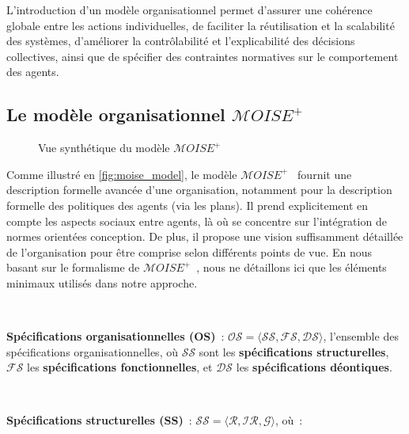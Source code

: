 L’introduction d’un modèle organisationnel permet d’assurer une cohérence globale entre les actions individuelles, de faciliter la réutilisation et la scalabilité des systèmes, d’améliorer la contrôlabilité et l’explicabilité des décisions collectives, ainsi que de spécifier des contraintes normatives sur le comportement des agents.

\subsection{Le modèle organisationnel $\mathcal{M}OISE^+$}

\begin{figure}[h!]
  \centering
  
  \caption{Vue synthétique du modèle $\mathcal{M}OISE^+$}
  \label{fig:moise_model}
\end{figure}

Comme illustré en \autoref{fig:moise_model}, le modèle $\mathcal{M}OISE^+$~\citep{Hubner2002} fournit une description formelle avancée d'une organisation, notamment pour la description formelle des politiques des agents (via les plans). Il prend explicitement en compte les aspects sociaux entre agents, là où  se concentre sur l'intégration de normes orientées conception. De plus, il propose une vision suffisamment détaillée de l'organisation pour être comprise selon différents points de vue.
En nous basant sur le formalisme de $\mathcal{M}OISE^+$~\citep{hubner2007moise}, nous ne détaillons ici que les éléments minimaux utilisés dans notre approche.

\

\noindent \textbf{Spécifications organisationnelles (OS)}~: \quad $\mathcal{OS} = \langle \mathcal{SS}, \mathcal{FS}, \mathcal{DS} \rangle$, l'ensemble des spécifications organisationnelles, où $\mathcal{SS}$ sont les \textbf{spécifications structurelles}, $\mathcal{FS}$ les \textbf{spécifications fonctionnelles}, et $\mathcal{DS}$ les \textbf{spécifications déontiques}.

\

\noindent \textbf{Spécifications structurelles (SS)}~: \quad $\mathcal{SS} = \langle \mathcal{R}, \mathcal{IR}, \mathcal{G} \rangle$, où~:


